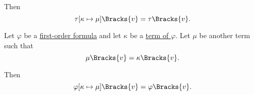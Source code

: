 \begin{proposition}
\begin{thmenum}
    Then
    \begin{equation}\label{eq:thm:first_order_substitution_equivalence/term_in_term}
      \tau[\kappa \mapsto \mu]\Bracks{v} = \tau\Bracks{v}.
    \end{equation}

     Let \( \varphi \) be a \hyperref[def:first_order_syntax/formula]{first-order formula} and let \( \kappa \) be a \hyperref[def:first_order_syntax/formula_terms]{term of \( \varphi \)}. Let \( \mu \) be another term such that
    \begin{equation}\label{eq:thm:first_order_substitution_equivalence/term_in_formula/compatibility}
      \mu\Bracks{v} = \kappa\Bracks{v}.
    \end{equation}

    Then
    \begin{equation}\label{eq:thm:first_order_substitution_equivalence/term_in_formula}
      \varphi[\kappa \mapsto \mu]\Bracks{v} = \varphi\Bracks{v}.
    \end{equation}
  \end{thmenum}
\end{proposition}

